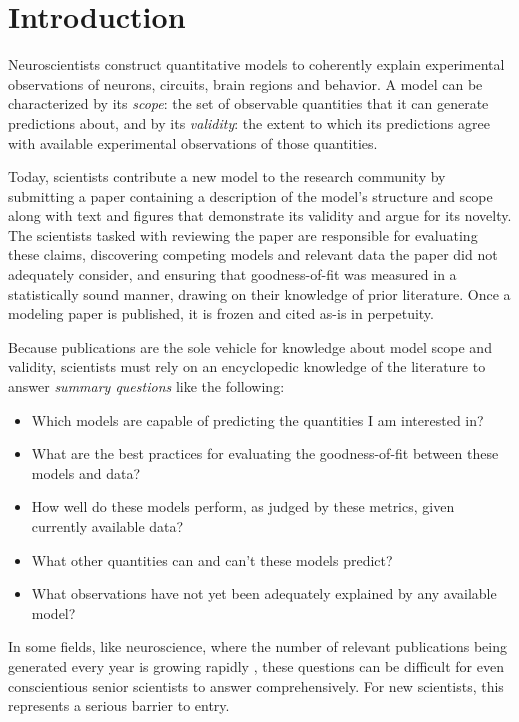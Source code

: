 \documentclass{frontiersSCNS}
\begin{document}
\section{Introduction}
\label{sec:introduction}
Neuroscientists construct quantitative models to coherently explain experimental observations of neurons, circuits, brain regions and behavior. 
A model can be characterized by its \textit{scope}: the set of observable quantities that it can generate predictions about, and by its \textit{validity}: the extent to which its predictions agree with available experimental  observations of those quantities.

Today, scientists contribute a new model to the research community by submitting a paper containing a description of the model's structure and scope along with text and figures that demonstrate its validity and argue for its novelty.  
The scientists tasked with reviewing the paper are  responsible for evaluating these claims, discovering competing models and relevant data the paper did not adequately consider, and ensuring that goodness-of-fit was measured in a statistically sound manner, drawing on their knowledge of prior literature. Once a modeling paper is published, it is frozen and cited as-is in perpetuity. 

Because publications are the sole vehicle for knowledge about model scope and validity, scientists must rely on an encyclopedic knowledge of the literature to answer \emph{summary questions} like the following:
\begin{itemize}
\item Which models are capable of predicting the quantities I am interested in?
\item What are the best practices for evaluating the goodness-of-fit between these models and  data?
\item How well do these models perform, as judged by these metrics, given currently available data?
\item What other quantities can and can't these models predict?
\item What observations have not yet been adequately explained by any available model?
\end{itemize}

In some fields, like neuroscience, where the number of relevant publications being generated every year is growing rapidly \citep{jinha_article_2010}, these questions can be difficult for even conscientious senior scientists to answer comprehensively. For new scientists, this represents a serious barrier to entry. 
\end{document}
